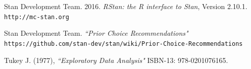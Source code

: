 \documentclass{article}
\begin{document}
\begin{thebibliography}{9}
Stan Development Team. 2016. 
\textit{RStan: the R interface to Stan}, Version 2.10.1.   
\texttt{http://mc-stan.org}

Stan Development Team.
\textit{``Prior Choice Recommendations"}
\texttt{https://github.com/stan-dev/stan/wiki/Prior-Choice-Recommendations}

Tukey J. (1977),
\textit{``Exploratory Data Analysis"}
ISBN-13: 978-0201076165.



\end{thebibliography}
\end{document}
